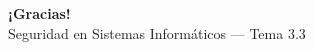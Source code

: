 \documentclass[aspectratio=169,11pt]{beamer}
\begin{document}
\begin{frame}[plain]
  \begin{center}
    {\Huge\bfseries\color{uznavy} ¡Gracias!}\\[1em]
    {\large Seguridad en Sistemas Informáticos --- Tema 3.3}
  \end{center}
\end{frame}

\end{document}
